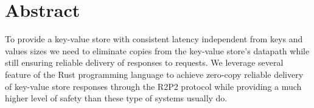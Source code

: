 \chapter*{Abstract}
To provide a key-value store with consistent latency independent from
keys and values sizes we need to eliminate copies from the key-value
store's datapath while still ensuring reliable delivery of responses
to requests. We leverage several feature of the Rust programming
language to achieve zero-copy reliable delivery of key-value store
responses through the R2P2 protocol while providing a much higher
level of safety than these type of systems usually do.



